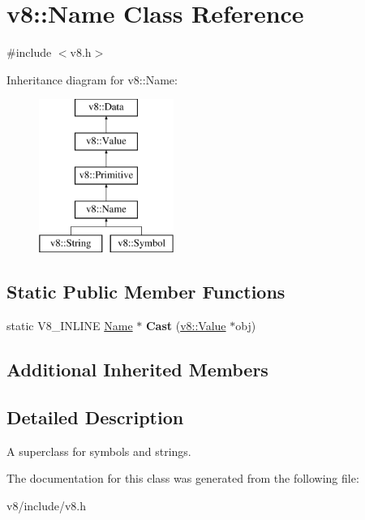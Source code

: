 \hypertarget{classv8_1_1Name}{}\section{v8\+:\+:Name Class Reference}
\label{classv8_1_1Name}


{\ttfamily \#include $<$v8.\+h$>$}

Inheritance diagram for v8\+:\+:Name\+:\begin{figure}[H]
\begin{center}
\leavevmode
\includegraphics[height=5.000000cm]{classv8_1_1Name}
\end{center}
\end{figure}
\subsection*{Static Public Member Functions}
\begin{DoxyCompactItemize}
\item 
\hypertarget{classv8_1_1Name_a8291aa8958f5dfb67d4415510f584ac4}{}static V8\+\_\+\+I\+N\+L\+I\+N\+E \hyperlink{classv8_1_1Name}{Name} $\ast$ {\bfseries Cast} (\hyperlink{classv8_1_1Value}{v8\+::\+Value} $\ast$obj)\label{classv8_1_1Name_a8291aa8958f5dfb67d4415510f584ac4}

\end{DoxyCompactItemize}
\subsection*{Additional Inherited Members}


\subsection{Detailed Description}
A superclass for symbols and strings. 

The documentation for this class was generated from the following file\+:\begin{DoxyCompactItemize}
\item 
v8/include/v8.\+h\end{DoxyCompactItemize}
